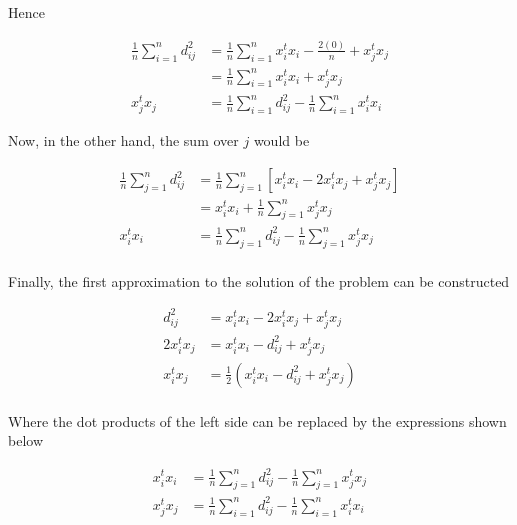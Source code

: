 \documentclass[12pt,journal]{IEEEtran}
\begin{document}
    Hence

    \begin{equation*}
        \begin{aligned}
            \frac{1}{n} \sum_{i=1}^n d_{ij}^2
            &=
            \frac{1}{n} \sum_{i=1}^n x_i^t x_i - \frac{2(0)}{n} + x_j^t x_j\\
            &=
            \frac{1}{n} \sum_{i=1}^n x_i^t x_i + x_j^t x_j\\
            x_j^t x_j &= \frac{1}{n} \sum_{i=1}^n d_{ij}^2 - \frac{1}{n} \sum_{i=1}^n x_i^t x_i
        \end{aligned}
    \end{equation*}

    Now, in the other hand, the sum over $j$ would be

    \begin{equation*}
        \begin{aligned}
            \frac{1}{n} \sum_{j=1}^n d_{ij}^2
            &=
            \frac{1}{n} \sum_{j=1}^n [x_i^t x_i - 2 x_i^t x_j + x_j^t x_j]\\
            &=
            x_i^t x_i + \frac{1}{n} \sum_{j=1}^n x_j^t x_j\\
            x_i^t x_i &= \frac{1}{n} \sum_{j=1}^n d_{ij}^2 - \frac{1}{n} \sum_{j=1}^n x_j^t x_j\\
        \end{aligned}
    \end{equation*}

    Finally, the first approximation to the solution of the problem can be
    constructed

    \begin{equation*}
        \begin{aligned}
            d_{ij}^2 &= x_i^t x_i - 2 x_i^t x_j + x_j^t x_j\\
            2 x_i^t x_j &= x_i^t x_i - d_{ij}^2 + x_j^t x_j\\
            x_i^t x_j &= \frac{1}{2} (x_i^t x_i - d_{ij}^2 + x_j^t x_j)\\
        \end{aligned}
    \end{equation*}

    Where the dot products of the left side can be replaced by the expressions
    shown below

    \begin{equation*}
        \begin{aligned}
            x_i^t x_i &= \frac{1}{n} \sum_{j=1}^n d_{ij}^2 - \frac{1}{n} \sum_{j=1}^n x_j^t x_j\\
            x_j^t x_j &= \frac{1}{n} \sum_{i=1}^n d_{ij}^2 - \frac{1}{n} \sum_{i=1}^n x_i^t x_i
        \end{aligned}
    \end{equation*}
\end{document}
